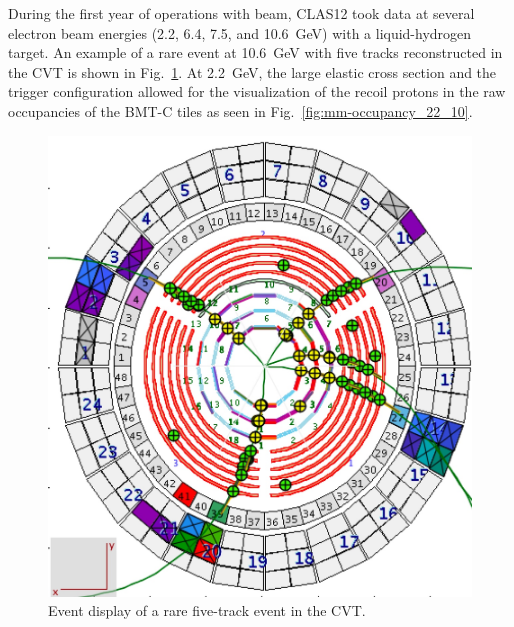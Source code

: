 During the first year of operations with beam, CLAS12 took data at several electron beam energies (2.2, 6.4, 7.5, and
10.6~GeV) with a liquid-hydrogen target. An example of a rare event at 10.6~GeV with five tracks reconstructed in the
CVT is shown in Fig.~\ref{fig:cd-tracks}. At 2.2~GeV, the large elastic cross section and the trigger configuration
allowed for the visualization of the recoil protons in the raw occupancies of the BMT-C tiles as seen in 
Fig.~\ref{fig:mm-occupancy_22_10}. 

\begin{figure}[htb]
  \centering
 \includegraphics[width=.9\columnwidth]{images/cd-tracks}
 \caption{Event display of a rare five-track event in the CVT.}
 \label{fig:cd-tracks}
\end{figure}

